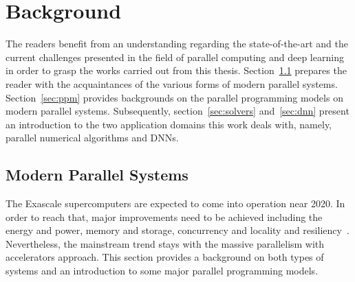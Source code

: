 \chapter{Background}
\label{chap:background}

The readers benefit from an understanding regarding the state-of-the-art and the 
current challenges presented in the field of parallel computing and deep 
learning in order to grasp the works carried out from this thesis.
Section~\ref{sec:mps} prepares the reader with the acquaintances of the various 
forms of modern parallel systems. Section~\ref{sec:ppm} provides backgrounds on 
the parallel programming models on modern parallel systems. Subsequently, 
section~\ref{sec:solvers} and~\ref{sec:dnn} present an introduction to the two 
application domains this work deals with, namely, parallel numerical algorithms 
and DNNs.

\section{Modern Parallel Systems}
\label{sec:mps}
The Exascale supercomputers are expected to come into operation near 2020. In 
order to reach that, major improvements need to be achieved including the energy 
and power, memory and storage, concurrency and locality and 
resiliency~\cite{doe}. Nevertheless, the mainstream trend stays with the massive 
parallelism with accelerators approach. This section provides a background on 
both types of systems and an introduction to some major parallel programming 
models.

